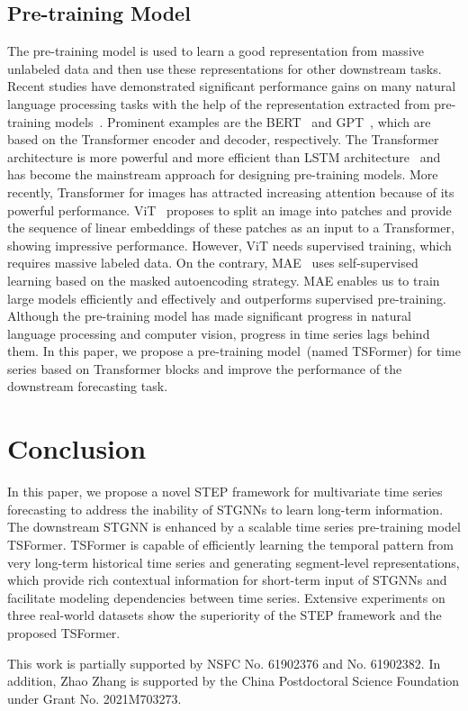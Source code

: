 \documentclass[sigconf]{acmart}
\begin{document}
\subsection{Pre-training Model}
The pre-training model is used to learn a good representation from massive unlabeled data and then use these representations for other downstream tasks.
Recent studies have demonstrated significant performance gains on many natural language processing tasks with the help of the representation extracted from pre-training models~\cite{2020PTM}.
Prominent examples are the BERT~\cite{2019BERT} and GPT~\cite{2020GPT}, which are based on the Transformer encoder and decoder, respectively.
The Transformer architecture is more powerful and more efficient than LSTM architecture~\cite{2014Seq2Seq, 2018ELMO} and has become the mainstream approach for designing pre-training models.
More recently, Transformer for images has attracted increasing attention because of its powerful performance.
ViT~\cite{2020ViT} proposes to split an image into patches and provide the sequence of linear embeddings of these patches as an input to a Transformer, showing impressive performance.
However, ViT needs supervised training, which requires massive labeled data.
On the contrary, MAE~\cite{2021MAE} uses self-supervised learning based on the masked autoencoding strategy. 
MAE enables us to train large models efficiently and effectively and outperforms supervised pre-training.
Although the pre-training model has made significant progress in natural language processing and computer vision, progress in time series lags behind them. In this paper, we propose a pre-training model~(named TSFormer) for time series based on Transformer blocks and improve the performance of the downstream forecasting task.
 \section{Conclusion}
In this paper, we propose a novel STEP framework for multivariate time series forecasting to address the inability of STGNNs to learn long-term information.
The downstream STGNN is enhanced by a scalable time series pre-training model TSFormer.
TSFormer is capable of efficiently learning the temporal pattern from very long-term historical time series and generating segment-level representations, which provide rich contextual information for short-term input of STGNNs and facilitate modeling dependencies between time series.
Extensive experiments on three real-world datasets show the superiority of the STEP framework and the proposed TSFormer.
 \begin{acks}
This work is partially supported by NSFC No. 61902376 and No. 61902382.
In addition, Zhao Zhang is supported by the China Postdoctoral Science Foundation under Grant No. 2021M703273.
\end{acks} 

\normalem

\appendix
\end{document}

